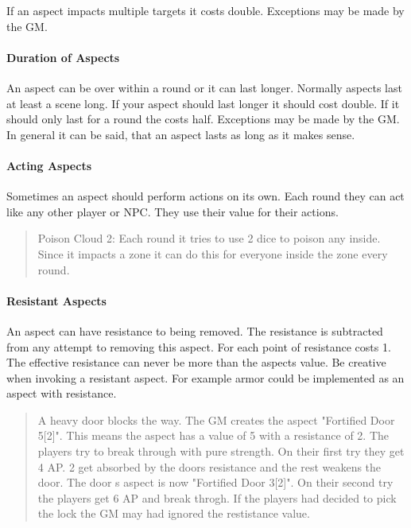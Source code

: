 \documentclass[11pt]{article}
\begin{document}
{If an aspect impacts multiple targets it costs double. Exceptions may be made by the GM.

\paragraph*{Duration of Aspects}
\label{sec:orgd4e441c}

An aspect can be over within a round or it can last longer. Normally aspects last at least a scene long. If your aspect should last longer it should cost double. If it should only last for a round the costs half. Exceptions may be made by the GM. In general it can be said, that an aspect lasts as long as it makes sense.

\paragraph*{Acting Aspects}
\label{sec:orgd6a0157}

Sometimes an aspect should perform actions on its own. Each round they can act like any other player or NPC. They use their value for their actions.

\begin{quote}
Poison Cloud 2: Each round it tries to use 2 dice to poison any inside. Since it impacts a zone it can do this for everyone inside the zone every round.
\end{quote}

\paragraph*{Resistant Aspects}
\label{sec:orgb879210}

An aspect can have resistance to being removed. The resistance is subtracted from any attempt to removing this aspect. For each point of resistance costs 1. The effective resistance can never be more than the aspects value. Be creative when invoking a resistant aspect. For example armor could be implemented as an aspect with resistance.

\begin{quote}
A heavy door blocks the way. The GM creates the aspect "Fortified Door 5[2]". This means the aspect has a value of 5 with a resistance of 2. The players try to break through with pure strength. On their first try they get 4 AP. 2 get absorbed by the doors resistance and the rest weakens the door. The door s aspect is now "Fortified Door 3[2]". On their second try the players get 6 AP and break throgh.
If the players had decided to pick the lock the GM may had ignored the restistance value.
\end{quote}


}
\end{document}
